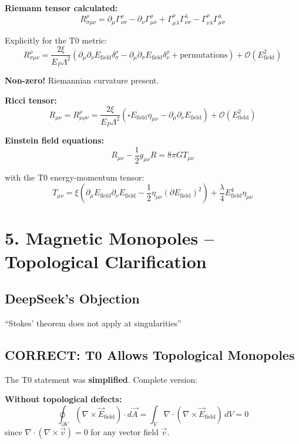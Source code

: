 	\textbf{Riemann tensor calculated:}
	\[
	R^\rho_{\sigma\mu\nu} = \partial_\mu \Gamma^\rho_{\nu\sigma} - \partial_\nu \Gamma^\rho_{\mu\sigma} + \Gamma^\rho_{\mu\lambda} \Gamma^\lambda_{\nu\sigma} - \Gamma^\rho_{\nu\lambda} \Gamma^\lambda_{\mu\sigma}
	\]
	
	Explicitly for the T0 metric:
	\[
	R^\rho_{\sigma\mu\nu} = \frac{2\xi}{E_P \Lambda^2} \left(\partial_\mu \partial_\nu E_{\text{field}} \delta^\rho_\sigma - \partial_\mu \partial_\sigma E_{\text{field}} \delta^\rho_\nu + \text{permutations}\right) + \mathcal{O}(E_{\text{field}}^2)
	\]
	
	\textbf{Non-zero!} \checkmark Riemannian curvature present.
	
	\textbf{Ricci tensor:}
	\[
	R_{\mu\nu} = R^\rho_{\mu\rho\nu} = \frac{2\xi}{E_P \Lambda^2} (\square E_{\text{field}} \eta_{\mu\nu} - \partial_\mu \partial_\nu E_{\text{field}}) + \mathcal{O}(E_{\text{field}}^2)
	\]
	
	\textbf{Einstein field equations:}
	\[
	R_{\mu\nu} - \frac{1}{2} g_{\mu\nu} R = 8\pi G T_{\mu\nu}
	\]
	
	with the T0 energy-momentum tensor:
	\[
	T_{\mu\nu} = \xi (\partial_\mu E_{\text{field}} \partial_\nu E_{\text{field}} - \frac{1}{2} \eta_{\mu\nu} (\partial E_{\text{field}})^2) + \frac{\lambda}{4} E_{\text{field}}^4 \eta_{\mu\nu}
	\]
	
	\section*{5. Magnetic Monopoles – Topological Clarification}
	
	\subsection*{DeepSeek's Objection}
	``Stokes' theorem does not apply at singularities''
	
	\subsection*{\textbf{CORRECT: T0 Allows Topological Monopoles}}
	
	The T0 statement was \textbf{simplified}. Complete version:
	
	\textbf{Without topological defects:}
	\[
	\oint_{\partial V} (\nabla \times \vec{E}_{\text{field}}) \cdot d\vec{A} = \int_V \nabla \cdot (\nabla \times \vec{E}_{\text{field}}) \, dV = 0
	\]
	since $\nabla \cdot (\nabla \times \vec{v}) = 0$ for any vector field $\vec{v}$.
	
